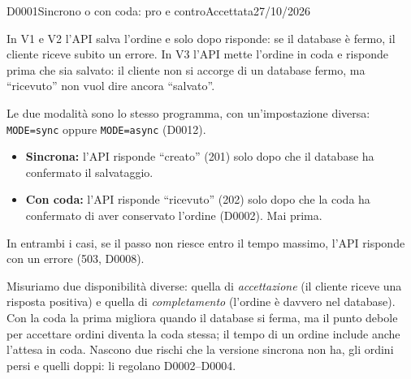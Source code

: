 \begin{decisione}{D0001}{Sincrono o con coda: pro e contro}{Accettata}{27/10/2026}

\contesto
In V1 e V2 l'API salva l'ordine e solo dopo risponde: se il database è fermo, il cliente riceve subito un errore. In V3 l'API mette l'ordine in coda e risponde prima che sia salvato: il cliente non si accorge di un database fermo, ma ``ricevuto'' non vuol dire ancora ``salvato''.

\scelta
Le due modalità sono lo stesso programma, con un'impostazione diversa: \texttt{MODE=sync} oppure \texttt{MODE=async} (D0012).
\begin{itemize}
  \item \textbf{Sincrona:} l'API risponde ``creato'' (201) solo dopo che il database ha confermato il salvataggio.
  \item \textbf{Con coda:} l'API risponde ``ricevuto'' (202) solo dopo che la coda ha confermato di aver conservato l'ordine (D0002). Mai prima.
\end{itemize}
In entrambi i casi, se il passo non riesce entro il tempo massimo, l'API risponde con un errore (503, D0008).

\conseguenze
Misuriamo due disponibilità diverse: quella di \emph{accettazione} (il cliente riceve una risposta positiva) e quella di \emph{completamento} (l'ordine è davvero nel database). Con la coda la prima migliora quando il database si ferma, ma il punto debole per accettare ordini diventa la coda stessa; il tempo di un ordine include anche l'attesa in coda. Nascono due rischi che la versione sincrona non ha, gli ordini persi e quelli doppi: li regolano D0002--D0004.

\end{decisione}
